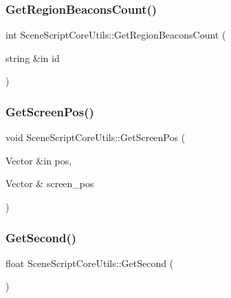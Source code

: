 \hypertarget{class_scene_script_core_utils_acc87a7db2e222d65eee89d9f7798d247}{}\label{class_scene_script_core_utils_acc87a7db2e222d65eee89d9f7798d247} 
\subsubsection{\texorpdfstring{Get\+Region\+Beacons\+Count()}{GetRegionBeaconsCount()}}
{\footnotesize\ttfamily int Scene\+Script\+Core\+Utils\+::\+Get\+Region\+Beacons\+Count (\begin{DoxyParamCaption}\item[{string \&in}]{id }\end{DoxyParamCaption})}

\hypertarget{class_scene_script_core_utils_a65568a59d7bb3ed4048223b1415e815b}{}\label{class_scene_script_core_utils_a65568a59d7bb3ed4048223b1415e815b} 
\subsubsection{\texorpdfstring{Get\+Screen\+Pos()}{GetScreenPos()}}
{\footnotesize\ttfamily void Scene\+Script\+Core\+Utils\+::\+Get\+Screen\+Pos (\begin{DoxyParamCaption}\item[{Vector \&in}]{pos,  }\item[{Vector \&}]{screen\+\_\+pos }\end{DoxyParamCaption})}

\hypertarget{class_scene_script_core_utils_aa11532473220da4cce608725cb3e8a35}{}\label{class_scene_script_core_utils_aa11532473220da4cce608725cb3e8a35} 
\subsubsection{\texorpdfstring{Get\+Second()}{GetSecond()}}
{\footnotesize\ttfamily float Scene\+Script\+Core\+Utils\+::\+Get\+Second (\begin{DoxyParamCaption}{ }\end{DoxyParamCaption})}

